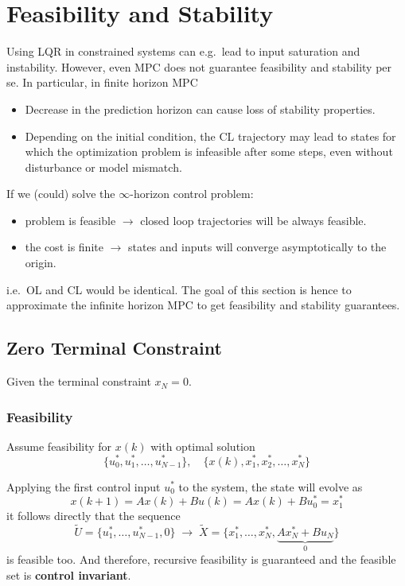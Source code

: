 \section{Feasibility and Stability}
Using LQR in constrained systems can e.g.\ lead to input saturation and instability. However, even MPC does not guarantee feasibility and stability per se. In particular, in finite horizon MPC
\begin{itemize}
    \item Decrease in the prediction horizon can cause loss of stability properties.
    \item Depending on the initial condition, the CL trajectory may lead to states for which the optimization problem is infeasible after some steps, even without disturbance or model mismatch.
\end{itemize}
If we (could) solve the $\infty$-horizon control problem:
\begin{itemize}
    \item problem is feasible $\rightarrow$ closed loop trajectories will be always feasible.
    \item the cost is finite $\rightarrow$ states and inputs will converge asymptotically to the origin.
\end{itemize}
i.e.\ OL and CL would be identical.
\newpar{}
The goal of this section is hence to approximate the infinite horizon MPC to get feasibility and stability guarantees.
\subsection{Zero Terminal Constraint}
Given the terminal constraint $x_N = 0$.
\subsubsection{Feasibility}
Assume feasibility for $x(k)$ with optimal solution
\begin{equation*}
    \{u_0^*, u_1^*, \ldots, u_{N-1}^*\}, \quad \{x(k),x_1^*, x_2^*, \ldots, x_N^*\}
\end{equation*}

Applying the first control input $u_0^*$ to the system, the state will evolve as
\begin{equation*}
    x(k+1) = Ax(k) + Bu(k) = Ax(k) + B u_0^* = x_1^*
\end{equation*}
it follows directly that the sequence
\begin{equation*}
    \widetilde{U}=\{u_1^*, \ldots, u_{N-1}^*, 0\}\; \to \; \widetilde{X}=\{x_1^*, \ldots, x_N^*, \underbrace{Ax_N^* + Bu_N}_{0}\}
\end{equation*}
is feasible too. And therefore, recursive feasibility is guaranteed and the feasible set is \textbf{control invariant}.

